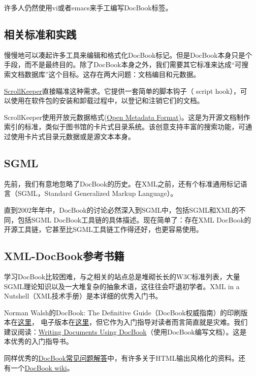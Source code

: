 \documentclass[12pt,oneside]{book}
\begin{document}
许多人仍然使用vi或者emacs来手工编写DocBook标签。

\subsection{相关标准和实践}
慢慢地可以凑起许多工具来编辑和格式化DocBook标记。但是DocBook本身只是个手段，而不是最终目的。除了DocBook本身之外，我们需要其它标准来达成“可搜索文档数据库”这个目标。这存在两大问题：文档编目和元数据。

\href{http://scrollkeeper.sourceforge.net/}{ScrollKeeper}直接瞄准这种需求。它提供一套简单的脚本钩子（ script hook），可以使用在软件包的安装和卸载过程中，以登记和注销它们的文档。

ScrollKeeper使用开放元数据格式(\href{http://www.ibiblio.org/osrt/omf/}{Open Metadata Format})。这是为开源文档制作索引的标准，类似于图书馆的卡片式目录系统。该创意支持丰富的搜索功能，可通过使用卡片式目录元数据或是源文本本身。

\subsection{SGML}
先前，我们有意地忽略了DocBook的历史。在XML之前，还有个标准通用标记语言（SGML，Standard Generalized Markup Language）。

直到2002年年中，DocBook的讨论必然深入到SGML中，包括SGML和XML的不同，包括SGML DocBook工具链的具体描述。现在简单了：存在XML DocBook的开源工具链，它甚至比SGML工具链工作得还好，也更容易使用。

\subsection{XML-DocBook参考书籍}
学习DocBook比较困难，与之相关的站点总是堆砌长长的W3C标准列表，大量SGML理论知识以及一大堆复杂的抽象术语，这往往会吓退初学者。XML in a Nutshell（XML技术手册）\cite{Harold-Means}是本详细的优秀入门书。

Norman Walsh的DocBook: The Definitive Guide（DocBook权威指南）的印刷版本在\href{http://www.oreilly.com/catalog/docbook/}{这里}，  电子版本在\href{http://www.docbook.org/tdg/en/html/docbook.html}{这里}，但它作为入门指导对读者而言简直就是灾难。我们建议阅读：\href{http://xml.web.cern.ch/XML/goossens/dbatcern/}{Writing Documents Using DocBook}（使用DocBook编写文档）。这是本优秀的入门指导书。

同样优秀的\href{http://www.dpawson.co.uk/docbook/}{DocBook常见问题解答}中，有许多关于HTML输出风格化的资料。还有一个\href{http://docbook.org/wiki/moin.cgi}{DocBook wiki}。
\end{document}

